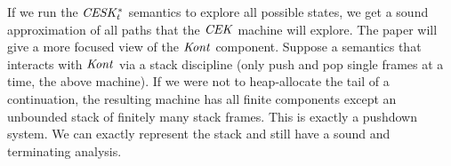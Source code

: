 If we run the $\mathit{CESK^*_t}$ semantics to explore all possible states, we get a sound approximation of all paths that the $\mathit{CEK}$ machine will explore.
%
The paper will give a more focused view of the $\mathit{Kont}$ component.
%
Suppose a semantics that interacts with $\mathit{Kont}$ via a stack discipline (only push and pop single frames at a time, \eg{} the above machine).
%
If we were not to heap-allocate the tail of a continuation, the resulting machine has all finite components except an unbounded stack of finitely many stack frames.
%
This is exactly a pushdown system.
%
We can exactly represent the stack and still have a sound and terminating analysis.